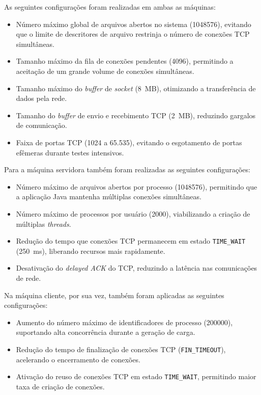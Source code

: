 \documentclass[12pt, openright, oneside, a4paper, english,	french,	spanish, brazil	]{abntex2}
\begin{document}
    As seguintes configurações foram realizadas em ambas as máquinas:
    \begin{itemize}
        \item Número máximo global de arquivos abertos no sistema (1048576), evitando que o limite de descritores de arquivo restrinja o número de conexões TCP simultâneas.
        \item Tamanho máximo da fila de conexões pendentes (4096), permitindo a aceitação de um grande volume de conexões simultâneas.
        \item Tamanho máximo do \textit{buffer} de \textit{socket} (8~MB), otimizando a transferência de dados pela rede.
        \item Tamanho do \textit{buffer} de envio e recebimento TCP (2~MB), reduzindo gargalos de comunicação.
        \item Faixa de portas TCP (1024 a 65.535), evitando o esgotamento de portas efêmeras durante testes intensivos.
    \end{itemize}

    Para a máquina servidora também foram realizadas as seguintes configurações:
    \begin{itemize}
        \item Número máximo de arquivos abertos por processo (1048576), permitindo que a aplicação Java mantenha múltiplas conexões simultâneas.
        \item Número máximo de processos por usuário (2000), viabilizando a criação de múltiplas \textit{threads}.
        \item Redução do tempo que conexões TCP permanecem em estado \texttt{TIME\_WAIT} (250~ms), liberando recursos mais rapidamente.
        \item Desativação do \textit{delayed ACK} do TCP, reduzindo a latência nas comunicações de rede.
    \end{itemize}

    Na máquina cliente, por sua vez, também foram aplicadas as seguintes configurações:
    \begin{itemize}
        \item Aumento do número máximo de identificadores de processo (200000), suportando alta concorrência durante a geração de carga.
        \item Redução do tempo de finalização de conexões TCP (\texttt{FIN\_TIMEOUT}), acelerando o encerramento de conexões.
        \item Ativação do reuso de conexões TCP em estado \texttt{TIME\_WAIT}, permitindo maior taxa de criação de conexões.
    \end{itemize}
    
\end{document}
